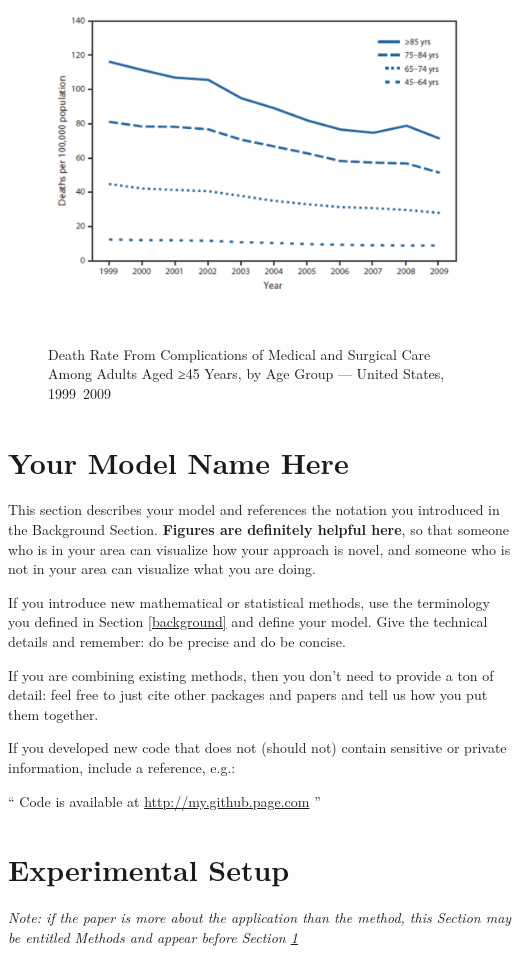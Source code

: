 \documentclass[twoside,11pt]{article}
\begin{document}
\begin{figure}[htbp]
  \centering 
  \includegraphics[height=10cm, width=15cm]{fig1} 
  \caption{Death Rate From Complications of Medical and Surgical Care Among Adults Aged ≥45 Years, by Age Group — United States, 1999~2009}
  \label{fig1} 
\end{figure} 

\section{Your Model Name Here} \label{model}
This section describes your model and references the notation you introduced in the Background Section. \textbf{Figures are definitely helpful here}, so that someone who is in your area can visualize how your approach is novel, and someone who is not in your area can visualize what you are doing.

If you introduce new mathematical or statistical methods, use the terminology you defined in Section \ref{background} and define your model. Give the technical details and remember: do be precise and do be concise.

If you are combining existing methods, then you don't need to provide a ton of detail: feel free to just cite other packages and papers and tell us how you put them together.  

If you developed new code that does not (should not) contain sensitive or private information, include a reference, e.g.:

`` Code is available at \url{http://my.github.page.com} ''

\section{Experimental Setup} \label{experiment}
\emph{Note: if the paper is more about the application than the method, this Section may be entitled Methods and appear before Section \ref{model}}
\end{document}
